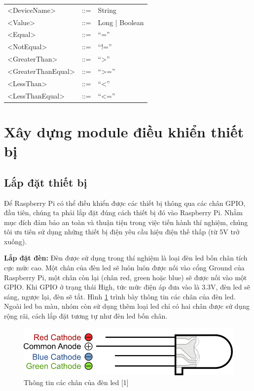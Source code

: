 \documentclass[11pt,a4paper,oneside]{book}
\begin{document}
\begin{table}[h]
\begin{tabular}[t]{ lll }
	<DeviceName> & ::= & String \\
	
	<Value> & ::= &	Long | Boolean \\
	
	<Equal> & ::= &	“=” \\
	
	<NotEqual> 	& ::= & “!=” \\
	
	<GreaterThan> &	::= & “>” \\
	
	<GreaterThanEqual> & ::= & “>=” \\
	
	<LessThan> 	& ::= & “<” \\
	
	<LessThanEqual>	& ::= & “<=”
	
	
\end{tabular}
\end{table}

\newpage
\section{Xây dựng module điều khiển thiết bị}
\subsection{Lắp đặt thiết bị}
Để Raspberry Pi có thể điều khiển được các thiết bị thông qua các chân GPIO, đầu tiên, chúng ta phải lắp đặt đúng cách thiết bị đó vào Raspberry Pi. Nhằm mục đích đảm bảo an toàn và thuận tiện trong việc tiến hành thí nghiệm, chúng tôi ưu tiên sử dụng những thiết bị điện yêu cầu hiệu điện thế thấp (từ 5V trở xuống).

\textbf{Lắp đặt đèn:} Đèn được sử dụng trong thí nghiệm là loại đèn led bốn chân tích cực mức cao. Một chân của đèn led sẽ luôn luôn được nối vào cổng Ground của Raspberry Pi, một chân còn lại (chân red, green hoặc blue) sẽ được nối vào một GPIO. Khi GPIO ở trạng thái High, tức mức điện áp đưa vào là 3.3V, đèn led sẽ sáng, ngược lại, đèn sẽ tắt. Hình \ref{fig:6-rgb-led} trình bày thông tin các chân của đèn led. Ngoài led ba màu, nhóm còn sử dụng thêm loại led chỉ có hai chân được sử dụng rộng rãi, cách lắp đặt tương tự như đèn led bốn chân.

\begin{figure}[h]
  \centering
     \includegraphics[scale=1.0]{6-rgb-led}
  \caption{Thông tin các chân của đèn led [1]}\label{fig:6-rgb-led}
\end{figure}
\end{document}
